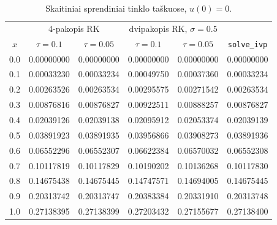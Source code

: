 \documentclass[12pt,a4paper]{article}
\begin{document}
\begin{table}[H]
\centering\small
\caption{Skaitiniai sprendiniai tinklo taškuose, $u(0)=0$.}
\begin{tabular}{c|cc|cc|c}
\toprule
 & \multicolumn{2}{c|}{4-pakopis RK} & \multicolumn{2}{c|}{dvipakopis RK, $\sigma=0.5$} & \\
$x$ & $\tau=0.1$ & $\tau=0.05$ & $\tau=0.1$ & $\tau=0.05$ & \texttt{solve\_ivp} \\
\midrule
0.0 & 0.00000000 & 0.00000000 & 0.00000000 & 0.00000000 & 0.00000000\\
0.1 & 0.00033230 & 0.00033234 & 0.00049750 & 0.00037360 & 0.00033234\\
0.2 & 0.00263526 & 0.00263534 & 0.00295575 & 0.00271542 & 0.00263534\\
0.3 & 0.00876816 & 0.00876827 & 0.00922511 & 0.00888257 & 0.00876827\\
0.4 & 0.02039126 & 0.02039138 & 0.02095912 & 0.02053374 & 0.02039139\\
0.5 & 0.03891923 & 0.03891935 & 0.03956866 & 0.03908273 & 0.03891936\\
0.6 & 0.06552296 & 0.06552307 & 0.06622384 & 0.06570032 & 0.06552308\\
0.7 & 0.10117819 & 0.10117829 & 0.10190202 & 0.10136268 & 0.10117830\\
0.8 & 0.14675438 & 0.14675445 & 0.14747571 & 0.14694005 & 0.14675445\\
0.9 & 0.20313742 & 0.20313747 & 0.20383384 & 0.20331910 & 0.20313748\\
1.0 & 0.27138395 & 0.27138399 & 0.27203432 & 0.27155677 & 0.27138400\\
\bottomrule
\end{tabular}
\end{table}
\end{document}
